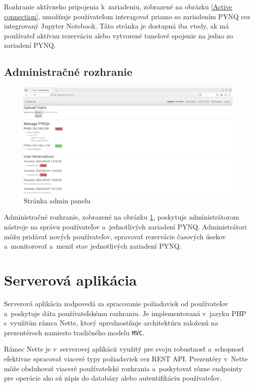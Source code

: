 Rozhranie aktívneho pripojenia k~zariadeniu, zobrazené na obrázku \ref{Active connection}, umožňuje používateľom interagovať priamo so zariadením PYNQ cez integrovaný Jupyter Notebook. Táto stránka je dostupná iba vtedy, ak má používateľ aktívnu rezerváciu alebo vytvorené tunelové spojenie na jedno zo zariadení PYNQ.


\subsection{Administračné rozhranie}

\begin{figure} \label{Admin panel}
    \centering
    \includegraphics[width=1\linewidth]{obrazky-figures/Admin_panel_site.png}
    \caption{Stránka admin panelu}
\end{figure}

Administračné rozhranie, zobrazené na obrázku \ref{Admin panel}, poskytuje administrátorom nástroje na správu používateľov a~jednotlivých zariadení PYNQ. Administrátori môžu pridávať nových používateľov, spravovať rezervácie časových úsekov a~monitorovať a~meniť stav jednotlivých zariadení PYNQ.


\section{Serverová aplikácia}

Serverová aplikácia zodpovedá za spracovanie požiadaviek od používateľov a~poskytuje dáta používateľskému rozhraniu. Je implementovaná v~jazyku PHP s~využitím rámca Nette, ktorý uprednostňuje architektúru založenú na prezentéroch namiesto tradičného modelu \verb|MVC|.

Rámec Nette je v~serverovej aplikácii využitý pre svoju robustnosť a~schopnosť efektívne spracovať viaceré typy požiadaviek cez REST API. Prezentéry v~Nette môže obsluhovať viaceré používateľské rozhrania a~poskytovať rôzne endpointy pre operácie ako sú zápis do databázy alebo autentifikáciu používateľov.

